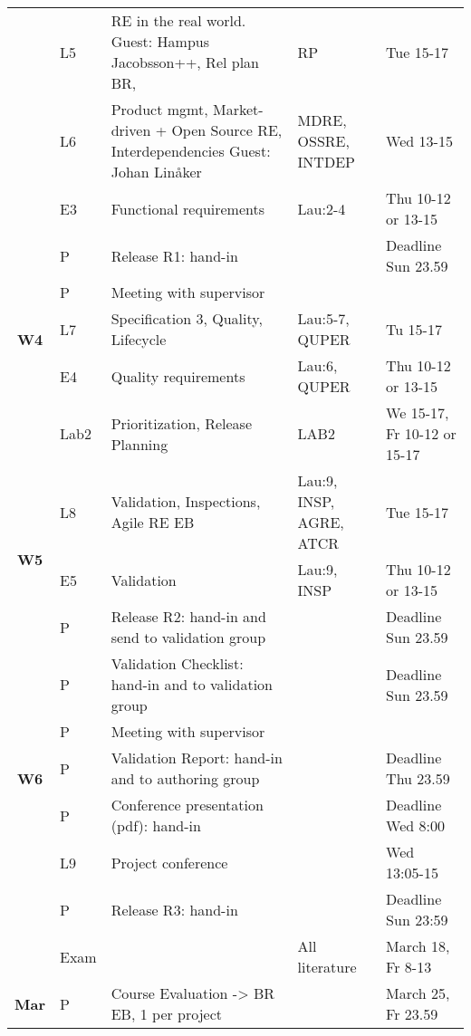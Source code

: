 \begin{flushleft}
\begin{tabular}{c | p{0.5cm} p{4.4cm} p{2.2cm}  p{3.2cm}}
& L5 & RE in the real world. Guest: Hampus Jacobsson++, Rel plan BR, & RP & Tue 15-17 \\
& L6 & Product mgmt, Market-driven + Open Source RE, Interdependencies Guest: Johan Linåker & MDRE, OSSRE, INTDEP & Wed 13-15 \\
& E3 & Functional requirements  & Lau:2-4  & Thu 10-12 or 13-15\\
& P & Release R1: hand-in& & Deadline Sun 23.59 \\
\hline
\multirow{3}{*}{{\bfseries\sffamily W4}} 
& P & Meeting with supervisor & & \\
& L7 & Specification 3, Quality, Lifecycle & Lau:5-7, QUPER  & Tu 15-17\\
& E4 & Quality requirements &  Lau:6, QUPER  &Thu 10-12 or 13-15\\
& Lab2 & Prioritization, Release Planning & LAB2 &   We 15-17, Fr 10-12 or 15-17\\
\hline
\multirow{3}{*}{{\bfseries\sffamily W5}} 
& L8 & Validation, Inspections, \newline  Agile RE EB& 
Lau:9, INSP, AGRE, ATCR & Tue 15-17\\
& E5 & Validation & Lau:9, INSP  & Thu 10-12 or 13-15\\
& P & Release R2: hand-in and send to validation group & & Deadline Sun 23.59 \\
& P & Validation Checklist: hand-in and to validation group & & Deadline Sun 23.59\\
\hline
\multirow{3}{*}{{\bfseries\sffamily W6}} 
& P & Meeting with supervisor & & \\
& P &  Validation Report: hand-in and to authoring group & & Deadline Thu 23.59  \\
\hline
\multirow{1}{*}{{\bfseries\sffamily W7}} 
& P & Conference presentation (pdf): hand-in & & Deadline Wed 8:00  \\
& L9 & Project conference &  & Wed 13:05-15\\
& P & Release R3: hand-in & & Deadline Sun 23:59\\
\hline
\multirow{1}{*}{{\bfseries\sffamily  }} 
& Exam & &All literature  & March 18, Fr 8-13\\
\multirow{1}{*}{{\bfseries\sffamily Mar }}   
&  P & \multirow{1}{*}{Course Evaluation -> BR EB, 1 per project} & & March 25, Fr 23.59\\
\hline
\end{tabular} 
\end{flushleft}

